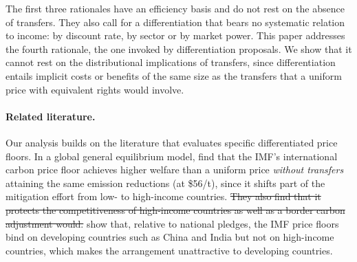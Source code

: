 \documentclass[12pt,english]{article}
\theoremstyle{remark}
\providecommand{\DIFdeltex}[1]{{\protect\color{red}\sout{#1}}}                      %
\providecommand{\DIFdelbegin}{} %
\providecommand{\DIFdelend}{} %
\providecommand{\DIFdel}[1]{\texorpdfstring{\DIFdeltex{#1}}{}} %
\newcommand{\DIFscaledelfig}{0.5}
\newlength{\DIFdelgraphicswidth} %
\newlength{\DIFdelgraphicsheight} %
\newcommand{\DIFdelincludegraphics}[2][]{%
\sbox{\DIFdelgraphicsbox}{\DIFOincludegraphics[#1]{#2}}%
\settoboxwidth{\DIFdelgraphicswidth}{\DIFdelgraphicsbox} %
\settoboxtotalheight{\DIFdelgraphicsheight}{\DIFdelgraphicsbox} %
\scalebox{\DIFscaledelfig}{%
\parbox[b]{\DIFdelgraphicswidth}{\usebox{\DIFdelgraphicsbox}\\[-\baselineskip] \rule{\DIFdelgraphicswidth}{0em}}\llap{\resizebox{\DIFdelgraphicswidth}{\DIFdelgraphicsheight}{%
\setlength{\unitlength}{\DIFdelgraphicswidth}%
\begin{picture}(1,1)%
\thicklines\linethickness{2pt} %
{\color[rgb]{1,0,0}\put(0,0){\framebox(1,1){}}}%
{\color[rgb]{1,0,0}\put(0,0){\line( 1,1){1}}}%
{\color[rgb]{1,0,0}\put(0,1){\line(1,-1){1}}}%
\end{picture}%
}\hspace*{3pt}}} %
} %
\DeclareRobustCommand{\DIFdelbegin}{\DIFOdelbegin \let\includegraphics\DIFdelincludegraphics} %
\DeclareRobustCommand{\DIFdelend}{\DIFOaddend \let\includegraphics\DIFOincludegraphics} %
\begin{document}
\DIFdelend The first three rationales have an efficiency basis and do not rest on the absence of transfers. They also call for a differentiation that bears no systematic relation to income: by discount rate, by sector or by market power. This paper addresses the fourth rationale, the one invoked by differentiation proposals. We show that it cannot rest on the distributional implications of transfers, since differentiation entails implicit costs or benefits of the same size as the transfers that a uniform price with equivalent rights would involve. %

\paragraph{Related literature.}
Our analysis builds on the literature that evaluates specific differentiated price floors. %
In a global general equilibrium model, \citet{chateau_global_2024} find that the IMF's international carbon price floor \citep{parry_proposal_2021} achieves higher welfare than a uniform price \textit{without transfers} attaining the same emission reductions (at \$56/t), since it shifts part of the mitigation effort from low- to high-income countries. \DIFdelbegin \DIFdel{They also find that it protects the competitiveness of high-income countries as well as a border carbon adjustment would. }\DIFdelend \citet{he_analysis_2024} show that, relative to national pledges, the IMF price floors bind on developing countries such as China and India but not on high-income countries, which makes the arrangement unattractive to developing countries. 
\end{document}
